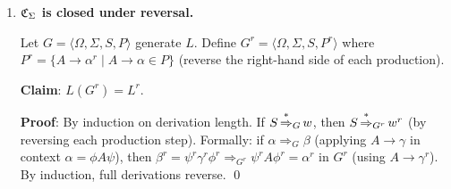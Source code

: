 \begin{enumerate}[{9.}1. ]
\begin{enumerate}
\item \textbf{Union}: Not closed. Let $L = \{\pmb{a}^n\pmb{b}^n\pmb{c}^n \mid n \geq 0\}$. Then $L \notin \CSIG$ (standard pumping argument) and $\overline{L} \notin \CSIG$ (if $\overline{L}$ were a CFL, then $L = \overline{\overline{L}}$ would be a CFL by closure under complement restricted to this context — more directly: the complement of a non-CFL need not be a CFL, but here $\overline{L} \cap \pmb{a}^*\pmb{b}^*\pmb{c}^* = \pmb{a}^*\pmb{b}^*\pmb{c}^* \setminus L$, and if $\overline{L}$ were a CFL its intersection with the regular language $\pmb{a}^*\pmb{b}^*\pmb{c}^*$ would be a CFL, but that intersection is not a CFL). So $L, \overline{L} \in \XSIG$, yet $L \cup \overline{L} = \Sigma^* \in \CSIG \setminus \XSIG$. Hence \XSIG\ is \emph{not} closed under union.

\item \textbf{Complement}: Not closed. If $L \in \XSIG$ (L is not CFL), $\overline{L}$ may or may not be in \XSIG. Since CFLs are not closed under complement, there exist non-CFLs whose complements are also non-CFLs, and non-CFLs whose complements are CFLs.

\item \textbf{Intersection}: Not closed. Similar argument.

\item \textbf{Kleene closure}: Not closed. $L = \{\pmb{a}^p \mid p \text{ prime}\} \in \XSIG$ (not regular, hence if unary: not CFL by Parikh), but $L^* = \{\pmb{a}^n \mid n \geq 0 \text{ or sum of primes}\} = \{\pmb{a}^n \mid n \neq 1\} \cup \{\lambda\}$ which is regular (hence CFL). So $L^* \notin \XSIG$.

\item \textbf{Concatenation}: Not closed. $L\cdot\Sigma^*$ for a non-CFL $L$ may be a CFL or not; specific examples show \XSIG\ is not closed.
\end{enumerate}

\item \textbf{$\mathfrak{C}_\Sigma$ is closed under reversal.}

Let $G = \langle\Omega,\Sigma,S,P\rangle$ generate $L$. Define $G^r = \langle\Omega,\Sigma,S,P^r\rangle$ where $P^r = \{A \to \alpha^r \mid A \to \alpha \in P\}$ (reverse the right-hand side of each production).

\textbf{Claim}: $L(G^r) = L^r$.

\textbf{Proof}: By induction on derivation length. If $S \operatorname{\overset{*}{\Rightarrow}}_G w$, then $S \operatorname{\overset{*}{\Rightarrow}}_{G^r} w^r$ (by reversing each production step). Formally: if $\alpha \Rightarrow_G \beta$ (applying $A \to \gamma$ in context $\alpha = \phi A\psi$), then $\beta^r = \psi^r\gamma^r\phi^r \Rightarrow_{G^r} \psi^r A\phi^r = \alpha^r$ in $G^r$ (using $A \to \gamma^r$). By induction, full derivations reverse. \qed


\end{enumerate}
